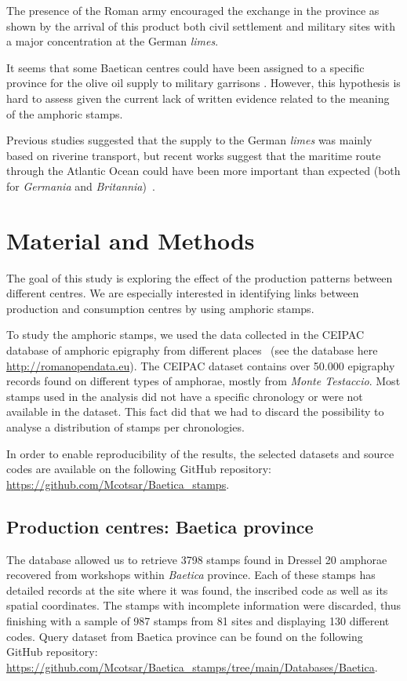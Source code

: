 The presence of the Roman army encouraged the exchange in the province as shown by the arrival of this product both civil settlement and military sites with a major concentration at the German \textit{limes}.

It seems that some Baetican centres could have been assigned to a specific province for the olive oil supply to military garrisons \citep[125]{remesal_concierto}. However, this hypothesis is hard to assess given the current lack of written evidence related to the meaning of the amphoric stamps. 

Previous studies suggested that the supply to the German \textit{limes} was mainly based on riverine transport, but recent works suggest that the maritime route through the Atlantic Ocean could have been more important than expected (both for \textit{Germania} and \textit{Britannia})~\citep{remesal_germn_2010,rubio-campillo_ecology_2018}.


\section{Material and Methods}
\label{sec:5}

The goal of this study is exploring the effect of the production patterns between different centres. We are especially interested in identifying links between production and consumption centres by using amphoric stamps. 

To study the amphoric stamps, we used the data collected in the CEIPAC database of amphoric epigraphy from different places~\citep{remesal_centro_2015} (see the database here \url{http://romanopendata.eu}). The CEIPAC dataset contains over 50.000 epigraphy records found on different types of amphorae, mostly from \textit{Monte Testaccio}. Most stamps used in the analysis did not have a specific chronology or were not available in the dataset. This fact did that we had to discard the possibility to analyse a distribution of stamps per chronologies. 

In order to enable reproducibility of the results, the selected datasets and source codes are available on the following GitHub repository: \url{https://github.com/Mcotsar/Baetica\_stamps}.

\subsection{Production centres: Baetica province}
\label{sec:5}

The database allowed us to retrieve 3798 stamps found in Dressel 20 amphorae recovered from workshops within \textit{Baetica} province. Each of these stamps has detailed records at the site where it was found, the inscribed code as well as its spatial coordinates. The stamps with incomplete information were discarded, thus finishing with a sample of 987 stamps from 81 sites and displaying 130 different codes. Query dataset from Baetica province can be found on the following GitHub repository: \url{https://github.com/Mcotsar/Baetica_stamps/tree/main/Databases/Baetica}. 
 

